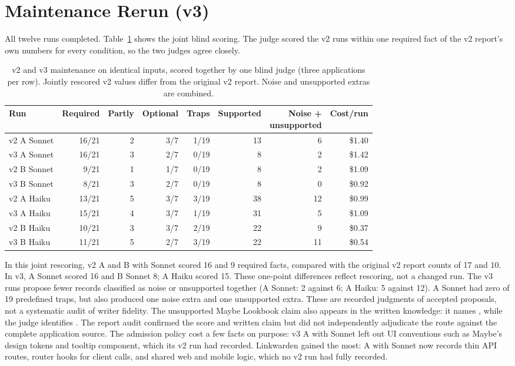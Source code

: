 \section{Maintenance Rerun (v3)}
\label{sec:v3}

All twelve runs completed. Table~\ref{tab:v3maint} shows the joint blind scoring. The judge scored the v2 runs within one required fact of the v2 report's own numbers for every condition, so the two judges agree closely.

\begin{table}[htbp]
\centering
\caption[Joint blind scoring of v2 and v3 maintenance.]{v2 and v3 maintenance on identical inputs, scored together by one blind judge (three applications per row). Jointly rescored v2 values differ from the original v2 report. Noise and unsupported extras are combined.}
\label{tab:v3maint}
\small
\setlength{\tabcolsep}{3pt}
\begin{tabular}{@{}lrrrrrrr@{}}
\toprule
Run & Required & Partly & Optional & Traps & Supported & \shortstack{Noise +\\unsupported} & Cost/run \\
\midrule
v2 A Sonnet & 16/21 & 2 & 3/7 & 1/19 & 13 & 6 & \$1.40 \\
v3 A Sonnet & 16/21 & 3 & 2/7 & 0/19 & 8 & 2 & \$1.42 \\
v2 B Sonnet & 9/21 & 1 & 1/7 & 0/19 & 8 & 2 & \$1.09 \\
v3 B Sonnet & 8/21 & 3 & 2/7 & 0/19 & 8 & 0 & \$0.92 \\
v2 A Haiku & 13/21 & 5 & 3/7 & 3/19 & 38 & 12 & \$0.99 \\
v3 A Haiku & 15/21 & 4 & 3/7 & 1/19 & 31 & 5 & \$1.09 \\
v2 B Haiku & 10/21 & 3 & 3/7 & 2/19 & 22 & 9 & \$0.37 \\
v3 B Haiku & 11/21 & 5 & 2/7 & 3/19 & 22 & 11 & \$0.54 \\
\bottomrule
\end{tabular}
\end{table}

In this joint rescoring, v2 A and B with Sonnet scored 16 and 9 required facts, compared with the original v2 report counts of 17 and 10. In v3, A Sonnet scored 16 and B Sonnet 8; A Haiku scored 15. These one-point differences reflect rescoring, not a changed run. The v3 runs propose fewer records classified as noise or unsupported together (A Sonnet: 2 against 6; A Haiku: 5 against 12). A Sonnet had zero of 19 predefined traps, but also produced one noise extra and one unsupported extra. These are recorded judgments of accepted proposals, not a systematic audit of writer fidelity. The unsupported Maybe Lookbook claim also appears in the written knowledge: it names , while the judge identifies . The report audit confirmed the score and written claim but did not independently adjudicate the route against the complete application source. The admission policy cost a few facts on purpose: v3 A with Sonnet left out UI conventions such as Maybe's design tokens and tooltip component, which its v2 run had recorded. Linkwarden gained the most: A with Sonnet now records thin API routes, router hooks for client calls, and shared web and mobile logic, which no v2 run had fully recorded.

